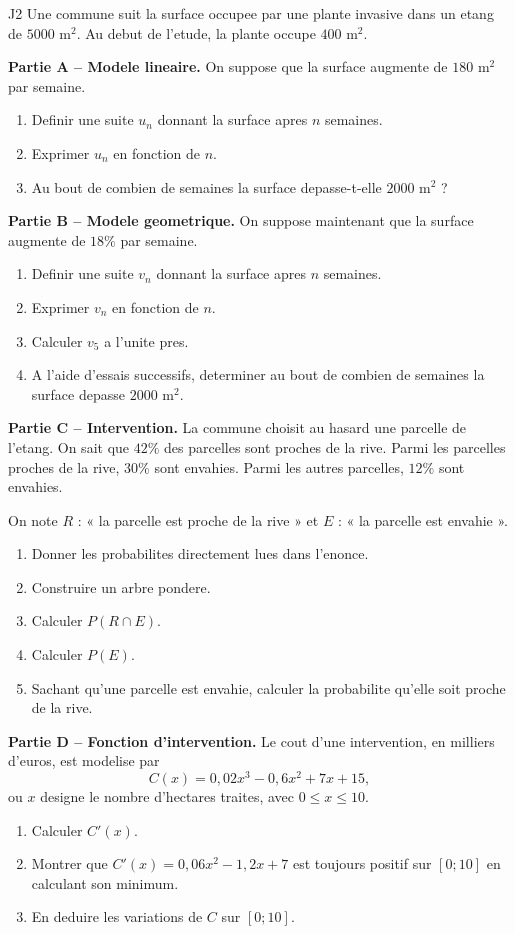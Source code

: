 \documentclass[11pt,a4paper]{article}
\begin{document}
\begin{exo}{J2}
Une commune suit la surface occupee par une plante invasive dans un etang de $5000$ m$^2$. Au debut de l'etude, la plante occupe $400$ m$^2$.

\textbf{Partie A -- Modele lineaire.} On suppose que la surface augmente de $180$ m$^2$ par semaine.
\begin{enumerate}
    \item Definir une suite $u_n$ donnant la surface apres $n$ semaines.
    \item Exprimer $u_n$ en fonction de $n$.
    \item Au bout de combien de semaines la surface depasse-t-elle $2000$ m$^2$ ?
\end{enumerate}

\textbf{Partie B -- Modele geometrique.} On suppose maintenant que la surface augmente de $18\%$ par semaine.
\begin{enumerate}[resume]
    \item Definir une suite $v_n$ donnant la surface apres $n$ semaines.
    \item Exprimer $v_n$ en fonction de $n$.
    \item Calculer $v_5$ a l'unite pres.
    \item A l'aide d'essais successifs, determiner au bout de combien de semaines la surface depasse $2000$ m$^2$.
\end{enumerate}

\textbf{Partie C -- Intervention.} La commune choisit au hasard une parcelle de l'etang. On sait que $42\%$ des parcelles sont proches de la rive. Parmi les parcelles proches de la rive, $30\%$ sont envahies. Parmi les autres parcelles, $12\%$ sont envahies.

On note $R$ : « la parcelle est proche de la rive » et $E$ : « la parcelle est envahie ».
\begin{enumerate}[resume]
    \item Donner les probabilites directement lues dans l'enonce.
    \item Construire un arbre pondere.
    \item Calculer $P(R\cap E)$.
    \item Calculer $P(E)$.
    \item Sachant qu'une parcelle est envahie, calculer la probabilite qu'elle soit proche de la rive.
\end{enumerate}

\textbf{Partie D -- Fonction d'intervention.} Le cout d'une intervention, en milliers d'euros, est modelise par
\[
C(x)=0,02x^3-0,6x^2+7x+15,
\]
ou $x$ designe le nombre d'hectares traites, avec $0\leq x\leq 10$.
\begin{enumerate}[resume]
    \item Calculer $C'(x)$.
    \item Montrer que $C'(x)=0,06x^2-1,2x+7$ est toujours positif sur $[0;10]$ en calculant son minimum.
    \item En deduire les variations de $C$ sur $[0;10]$.
\end{enumerate}
\end{exo}
\end{document}
